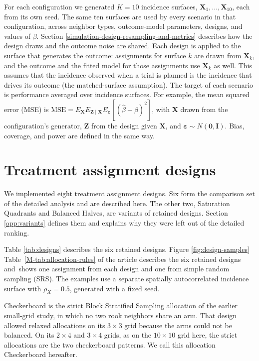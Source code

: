 \documentclass[11pt]{article}
\begin{document}
For each configuration we generated \(K = 10\) incidence surfaces,
\(\mathbf{X}_1, \dots, \mathbf{X}_{10}\), each from its own seed. The same ten surfaces
are used by every scenario in that configuration, across neighbor types,
outcome-model parameters, designs, and values of \(\beta\). Section
\ref{simulation-design-resampling-and-metrics} describes how the design
draws and the outcome noise are shared. Each design is applied
to the surface that generates the outcome: assignments for surface \(k\)
are drawn from \(\mathbf{X}_k\), and the outcome and the fitted model for those
assignments use \(\mathbf{X}_k\) as well. This assumes that the incidence
observed when a trial is planned is the incidence that drives its
outcome (the matched-surface assumption). The target of each scenario is
performance averaged over incidence surfaces. For example, the mean squared error (MSE) is \(\text{MSE} = E_{\mathbf{X}} E_{\mathbf{Z} \mid \mathbf{X}} E_{\boldsymbol{\varepsilon}}[(\hat\beta - \beta)^2]\), with
\(\mathbf{X}\) drawn from the configuration's generator, \(\mathbf{Z}\) from the design
given \(\mathbf{X}\), and \(\boldsymbol{\varepsilon} \sim N(\mathbf{0}, \mathbf{I})\). Bias, coverage, and power
are defined in the same way.

\FloatBarrier
\section{Treatment assignment designs}\label{treatment-assignment-designs}


We implemented eight treatment assignment designs. Six form the
comparison set of the detailed analysis and are described here. The other
two, Saturation Quadrants and Balanced Halves, are variants of retained
designs. Section \ref{app:variants} defines them and explains why they
were left out of the detailed ranking.

\iffullsi Table \ref{tab:designs} describes the six retained designs. Figure \ref{fig:design-samples}\else
Table~\ref{M-tab:allocation-rules} of the article describes the six retained designs and\fi\ shows one assignment
from each design and one from simple random sampling (SRS). The examples
use a separate spatially autocorrelated incidence surface with
$\rho_X = 0.5$, generated with a fixed seed.

Checkerboard is the strict Block Stratified Sampling allocation of the
earlier small-grid study, in which no two rook neighbors share an arm.
That design allowed relaxed allocations on its \(3\times3\) grid because
the arms could not be balanced. On its \(2\times4\) and \(3\times4\)
grids, as on the \(10\times10\) grid here, the strict allocations are the
two checkerboard patterns. We call this allocation Checkerboard hereafter.
\end{document}
